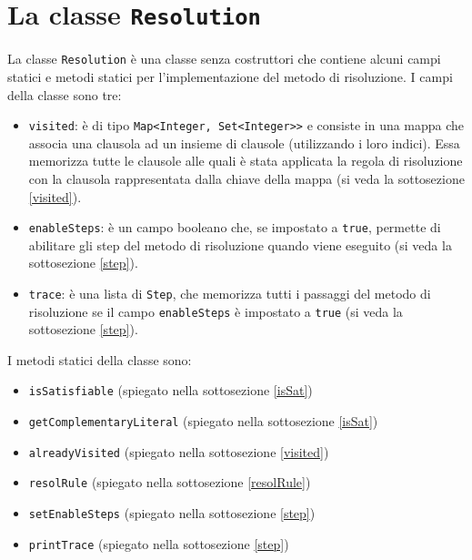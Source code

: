 \documentclass[a4paper,12pt]{report}
\begin{document}
\section{La classe \texttt{Resolution}}
\label{class:Resolution}
La classe \texttt{Resolution} è una classe senza costruttori che contiene alcuni campi statici e metodi statici per l'implementazione del metodo di risoluzione. I campi della classe sono tre:
\begin{itemize}
    \item \texttt{visited}: è di tipo \texttt{Map<Integer, Set<Integer>>} e consiste in una mappa che associa una clausola ad un insieme di clausole (utilizzando i loro indici). Essa memorizza tutte le clausole alle quali è stata applicata la regola di risoluzione con la clausola rappresentata dalla chiave della mappa (si veda la sottosezione \ref{visited}).
    \item \texttt{enableSteps}: è un campo booleano che, se impostato a \texttt{true}, permette di abilitare gli step del metodo di risoluzione quando viene eseguito (si veda la sottosezione \ref{step}).
    \item \texttt{trace}: è una lista di \texttt{Step}, che memorizza tutti i passaggi del metodo di risoluzione se il campo \texttt{enableSteps} è impostato a \texttt{true} (si veda la sottosezione \ref{step}).
\end{itemize}

I metodi statici della classe sono:
\begin{itemize}
    \item \texttt{isSatisfiable} (spiegato nella sottosezione \ref{isSat})
    \item \texttt{getComplementaryLiteral} (spiegato nella sottosezione \ref{isSat})
    \item \texttt{alreadyVisited} (spiegato nella sottosezione \ref{visited})
    \item \texttt{resolRule} (spiegato nella sottosezione \ref{resolRule})
    \item \texttt{setEnableSteps} (spiegato nella sottosezione \ref{step})
    \item \texttt{printTrace} (spiegato nella sottosezione \ref{step})
\end{itemize}
\end{document}
